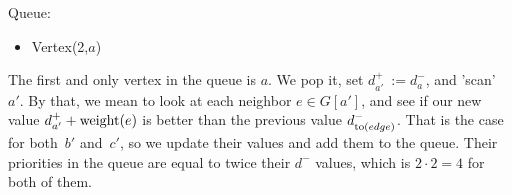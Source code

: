 \begin{minipage}{.75\linewidth}
\end{minipage}\hfill%
\begin{minipage}{.22\linewidth}
    Queue:
    \begin{itemize}
        \item Vertex(2,$a$)
    \end{itemize}
\end{minipage}

The first and only vertex in the queue is $a$. We pop it, set $d^+_{a'}~:= d^-_a$, and 'scan'~$a'$. By that, we mean to look at each neighbor $e \in G[a']$, and see if our new value $d^+_{a'} + \operatorname{weight}(e)$ is better than the previous value $d^-_{\operatorname{to}(edge)}$. That is the case for both~$b'$ and~$c'$, so we update their values and add them to the queue. Their priorities in the queue are equal to twice their $d^-$ values, which is $2 \cdot 2 = 4$ for both of them.

